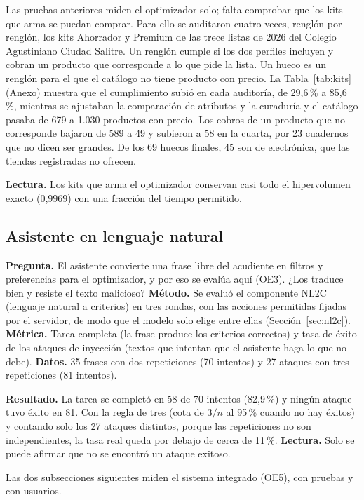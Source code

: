 Las pruebas anteriores miden el optimizador solo; falta comprobar que los kits que arma se puedan
comprar. Para ello se auditaron cuatro veces, renglón por renglón, los kits Ahorrador y Premium de las
trece listas de 2026 del Colegio Agustiniano Ciudad Salitre. Un renglón cumple si los dos perfiles
incluyen y cobran un producto que corresponde a lo que pide la lista. Un hueco es un renglón para el que
el catálogo no tiene producto con precio. La Tabla~\ref{tab:kits} (Anexo) muestra que el cumplimiento subió en
cada auditoría, de 29,6\,\% a 85,6\,\%, mientras se ajustaban la comparación de atributos y la curaduría
y el catálogo pasaba de 679 a 1.030 productos con precio. Los cobros de un producto que no corresponde
bajaron de 589 a 49 y subieron a 58 en la cuarta, por 23 cuadernos que no dicen ser grandes. De los 69
huecos finales, 45 son de electrónica, que las tiendas registradas no ofrecen.

\textbf{Lectura.} Los kits que arma el optimizador conservan casi todo el hipervolumen exacto (0,9969)
con una fracción del tiempo permitido.

\subsection{Asistente en lenguaje natural}
\label{sec:resultados-nl2c}

\textbf{Pregunta.} El asistente convierte una frase libre del acudiente en filtros y preferencias para
el optimizador, y por eso se evalúa aquí (OE3). ¿Los traduce bien y resiste el texto malicioso?
\textbf{Método.} Se evaluó el componente NL2C (lenguaje natural a criterios) en tres rondas, con las
acciones permitidas fijadas por el servidor, de modo que el modelo solo elige entre ellas
(Sección~\ref{sec:nl2c}). \textbf{Métrica.} Tarea completa (la frase produce los criterios correctos) y
tasa de éxito de los ataques de inyección (textos que intentan que el asistente haga lo que no debe).
\textbf{Datos.} 35 frases con dos repeticiones (70 intentos) y 27 ataques con tres repeticiones (81
intentos).

\textbf{Resultado.} La tarea se completó en 58 de 70 intentos (82,9\,\%) y ningún ataque tuvo éxito en 81.
Con la regla de tres (cota de $3/n$ al 95\,\% cuando no hay éxitos) y contando solo los 27 ataques
distintos, porque las repeticiones no son independientes, la tasa real queda por debajo de cerca de 11\,\%. \textbf{Lectura.} Solo se puede afirmar que
no se encontró un ataque exitoso.

Las dos subsecciones siguientes miden el sistema integrado (OE5), con pruebas y con usuarios.


